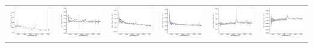 \begin{center}
\begin{longtable}{l l l l l l }
    \includegraphics[width=0.3\linewidth, clip]{Figs/Figs-sdss/spec-7820-56984-0072-STRIPE82-0065-043212.pdf} & \includegraphics[width=0.3\linewidth, clip]{Figs/Figs-sdss/spec-7822-57041-0034-STRIPE82-0061-046539.pdf} & \includegraphics[width=0.3\linewidth, clip]{Figs/Figs-sdss/spec-7856-57260-0204-STRIPE82-0018-064634.pdf} & \includegraphics[width=0.3\linewidth, clip]{Figs/Figs-sdss/spec-7864-56979-0753-STRIPE82-0008-034263.pdf} & \includegraphics[width=0.3\linewidth, clip]{Figs/Figs-sdss/spec-7866-57002-0979-STRIPE82-0014-010956.pdf} & \includegraphics[width=0.3\linewidth, clip]{Figs/Figs-sdss/spec-7868-57006-0207-STRIPE82-0015-016996.pdf} \\

\end{longtable}
\end{center}
